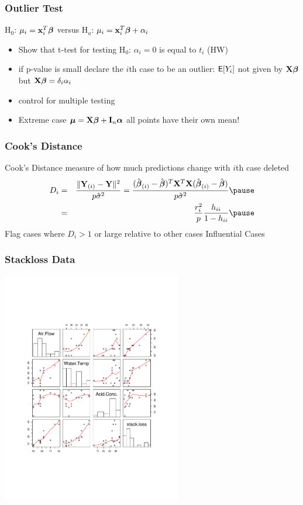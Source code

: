 \documentclass[]{beamer}
\begin{document}
  \begin{frame}
    \frametitle{Outlier Test}
    H$_0$: $\mu_i = \mathbf{x}_i^T \boldsymbol{\beta}$  versus H$_a$: $\mu_i = \mathbf{x}_i^T\boldsymbol{\beta} +
    \alpha_i$  \pause
    \begin{itemize}
    \item  Show that t-test for testing H$_0$: $\alpha_i = 0$ is equal
      to $t_i$ (HW)  \pause
  \item if p-value is
small declare the $i$th case to be an outlier:  $\textsf{E}[Y_i]$ not given by
$\mathbf{X} \boldsymbol{\beta}$  but $\mathbf{X}\boldsymbol{\beta} = \delta_i \alpha_i$    \pause
\item control for multiple testing  \pause
\item Extreme case $\boldsymbol{\mu} = \mathbf{X}\boldsymbol{\beta} + \mathbf{I}_n \boldsymbol{\alpha}$  all points have their
  own mean!   \pause
    \end{itemize}
  \end{frame}
  \begin{frame}
    \frametitle{Cook's Distance}
    Cook's Distance  measure of how much predictions change with $i$th
    case deleted  \pause
    \begin{eqnarray*}
D_i & =  &\frac{\| \Y_{(i)} - \Y \|^2}{ p \shat} = 
\frac{ (\bhat_{(i)} - \bhat)^T \X^T\X (\bhat_{(i)} - \bhat) }{ p
  \shat}  \pause \\
& = & \frac{r_i^2}{p} \frac{h_{ii}}{ 1 - h_{ii}}  \pause
    \end{eqnarray*}
Flag cases where $D_i > 1$ or large relative to other cases
 \pause
\vspace{18pt}
Influential Cases
  \end{frame}
  \begin{frame}
   \frametitle{Stackloss Data}
\vspace{-24pt}
    \centerline{\includegraphics[height=4in]{stackloss-pair}}
  \end{frame}
\end{document}
